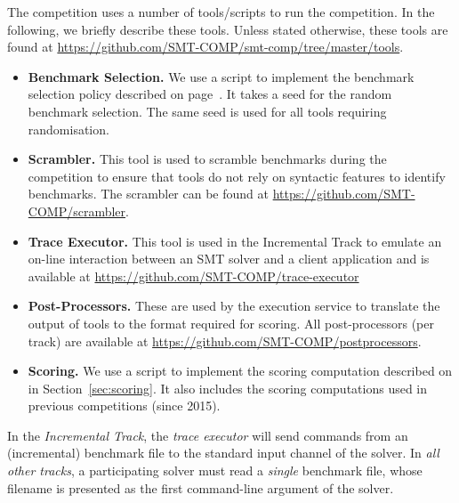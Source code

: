 \documentclass[12pt]{article}
\newcommand{\inctrack}{Incremental Track\xspace}
\newcommand{\executionservice}{execution service\xspace}
\begin{document}
 \label{tools}
The competition uses a number of tools/scripts to run the competition. In the
following, we briefly describe these tools. Unless stated otherwise, these
tools are found at \url{https://github.com/SMT-COMP/smt-comp/tree/master/tools}.
\begin{itemize}
  \item \textbf{Benchmark Selection.} We use a script to implement the
    benchmark selection policy described on page~\pageref{benchmark-selection}.
    It takes a seed for the random benchmark selection. The same seed is used
    for all tools requiring randomisation.
  \item \textbf{Scrambler.} This tool is used to scramble benchmarks during the
    competition to ensure that tools do not rely on syntactic features to
    identify benchmarks. The scrambler can be found at
    \url{https://github.com/SMT-COMP/scrambler}.
  \item \textbf{Trace Executor.} This tool is used in the \inctrack to emulate
    an on-line interaction between an SMT solver and a client application and
    is available at \url{https://github.com/SMT-COMP/trace-executor}
  \item \textbf{Post-Processors.} These are used by the \executionservice to translate the
    output of tools to the format required for scoring. All post-processors (per
    track) are available at \url{https://github.com/SMT-COMP/postprocessors}.
  \item \textbf{Scoring.} We use a script to implement the scoring computation
    described on in Section~\ref{sec:scoring}. It also includes the scoring
    computations used in previous competitions (since 2015).
\end{itemize}

%
In the \emph{\inctrack}, the \emph{trace executor} will send commands from an
(incremental) benchmark file to the standard input channel of the solver.  In
\emph{all other tracks}, a participating solver must read a \emph{single}
benchmark file, whose filename is presented as the first command-line argument
of the solver.
\end{document}
